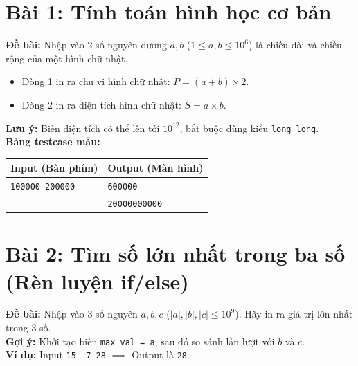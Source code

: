 \documentclass[11pt,a4paper]{article}
\begin{document}
\section*{\color{AsianDarkBlue}Bài 1: Tính toán hình học cơ bản}
\textbf{Đề bài:} Nhập vào 2 số nguyên dương $a, b$ ($1 \le a, b \le 10^6$) là chiều dài và chiều rộng của một hình chữ nhật.
\begin{itemize}
    \setlength{\itemsep}{1pt}
    \item Dòng 1 in ra chu vi hình chữ nhật: $P = (a + b) \times 2$.
    \item Dòng 2 in ra diện tích hình chữ nhật: $S = a \times b$.
\end{itemize}
\textbf{Lưu ý:} Biến diện tích có thể lên tới $10^{12}$, bắt buộc dùng kiểu \texttt{long long}.\\
\textbf{Bảng testcase mẫu:}
\begin{table}[h!]
\centering\small
\begin{tabular}{|p{7.5cm}|p{7.5cm}|}
\hline
\textbf{Input (Bàn phím)} & \textbf{Output (Màn hình)} \\ \hline
\texttt{100000 200000} & \texttt{600000} \\
& \texttt{20000000000} \\ \hline
\end{tabular}
\end{table}

\section*{\color{AsianDarkBlue}Bài 2: Tìm số lớn nhất trong ba số (Rèn luyện if/else)}
\textbf{Đề bài:} Nhập vào 3 số nguyên $a, b, c$ ($|a|, |b|, |c| \le 10^9$). Hãy in ra giá trị lớn nhất trong 3 số.\\
\textbf{Gợi ý:} Khởi tạo biến \texttt{max\_val = a}, sau đó so sánh lần lượt với $b$ và $c$.\\
\textbf{Ví dụ:} Input \texttt{15 -7 28} $\implies$ Output là \texttt{28}.

\newpage
\end{document}
